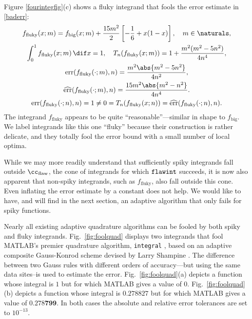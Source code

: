 \documentclass[]{article}
\DeclareMathOperator{\flawinteg}{\texttt{\textup{flawint}}}
\DeclareMathOperator{\err}{err}
\newcommand{\herr}{\widehat{\err}}
\theoremstyle{definition}
\theoremstyle{remark}
\newcommand{\Matlab}{MATLAB\xspace}
\begin{document}
Figure \ref{fourintegfig}(c) shows a fluky integrand that fools the error estimate in \eqref{baderr}:
\begin{subequations} \label{fluky}
\begin{gather} 
f_{\text{fluky}}(x;m) = f_{\text{big}}(x;m) + \frac{15m^2}{2}\left[- \frac{1}{6}+ x(1-x) \right], \quad m \in \naturals, \\
\int_0^1 f_{\text{fluky}}(x;m) \, \dif x =  1, \quad T_{n}(f_{\text{fluky}}(x;m))=1 + \frac{m^2(m^2-5 n^2)}{4n^4}, \\
\err(f_{\text{fluky}}(\cdot;m),n)=\frac{m^2 \abs{m^2-5n^2}}{4n^2}, \\
 \herr(f_{\text{fluky}}(\cdot;m),n) = \frac{15 m^2 \abs{m^2-n^2}}{4 n^4}.
\\
\label{failcond}
\err(f_{\text{fluky}}(\cdot;n),n)=1 \ne 0 = T_{n}(f_{\text{fluky}}(x;n)) = \herr(f_{\text{fluky}}(\cdot;n),n).
\end{gather}
\end{subequations}
The integrand $f_{\text{fluky}}$ appears to be quite ``reasonable''---similar in shape to $f_{\text{big}}$.  We label integrands like this one ``fluky'' because their construction is rather delicate, and they totally fool the error bound with a small number of local optima.

While we may more readily understand that sufficiently spiky integrands fall outside $\cc_{\text{flaw}}$, the cone of integrands for which $\flawinteg$ succeeds, it is now also apparent that non-spiky integrands, such as $f_{\text{fluky}}$, also fall outside this cone. Even inflating the error estimate by a constant does not help. We would like to have, and will find in the next section, an adaptive algorithm that only fails for spiky functions. 

Nearly all existing adaptive quadrature algorithms can be fooled by both spiky and fluky integrands.  Fig.\  \ref{fig:foolquad} displays two integrands that fool \Matlab's premier quadrature algorithm, {\tt integral} \cite{MAT8.4},  based on an adaptive composite Gauss-Konrod scheme devised by Larry Shampine .  The difference between two Gauss rules with different orders of accuracy---but using the same data sites--is used to estimate the error.  Fig.\  \ref{fig:foolquad}(a) depicts a function whose integral is $1$ but for which \Matlab gives a value of $0$.   Fig.\  \ref{fig:foolquad}(b) depicts a function whose integral is $0.278827$  but for which \Matlab gives a value of $0.278\boldsymbol{799}$.  In both cases the absolute and relative error tolerances are set to $10^{-13}$.
\end{document}

